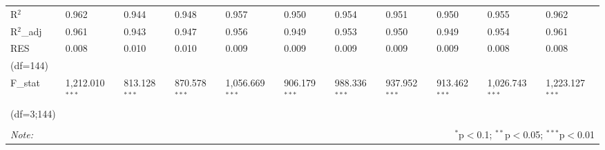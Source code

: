 \begin{table}[H]
\begin{tabularx}{\textwidth}{XXXXXXXXXXl}
R$^{2}$ & 0.962 & 0.944 & 0.948 & 0.957 & 0.950 & 0.954 & 0.951 & 0.950 & 0.955 & 0.962 \\ 
R$^{2}$_{adj} & 0.961 & 0.943 & 0.947 & 0.956 & 0.949 & 0.953 & 0.950 & 0.949 & 0.954 & 0.961 \\ 
RES & 0.008 & 0.010 & 0.010 & 0.009 & 0.009 & 0.009 & 0.009 & 0.009 & 0.008 & 0.008 \\ 
(df=144) & & & & & & & & & & \\
F_{stat} & 1,212.010$^{***}$ & 813.128$^{***}$ & 870.578$^{***}$ & 1,056.669$^{***}$ & 906.179$^{***}$ & 988.336$^{***}$ & 937.952$^{***}$ & 913.462$^{***}$ & 1,026.743$^{***}$ & 1,223.127$^{***}$ \\ 
(df=3;144) & & & & & & & & & & \\
\hline 
\hline \\[-1.8ex] 
\textit{Note:}  & \multicolumn{10}{r}{$^{*}$p$<$0.1; $^{**}$p$<$0.05; $^{***}$p$<$0.01} \\ 
\end{tabularx} 
\end{table} 




